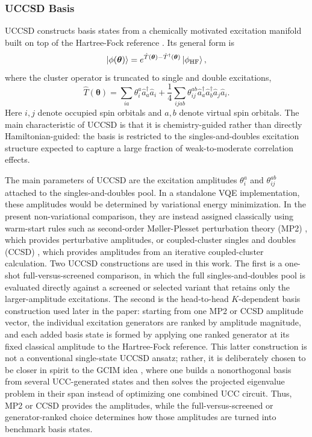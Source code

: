 \subsubsection{UCCSD Basis}

UCCSD constructs basis states from a chemically motivated excitation manifold built on top of the Hartree-Fock reference \cite{anand2022ucc}. Its general form is
\begin{equation}
\ket{\phi(\boldsymbol{\theta})}
= e^{\hat{T}(\boldsymbol{\theta})-\hat{T}^{\dagger}(\boldsymbol{\theta})}
\ket{\phi_{\mathrm{HF}}},
\end{equation}
where the cluster operator is truncated to single and double excitations,
\begin{equation}
\hat{T}(\boldsymbol{\theta})
= \sum_{ia} \theta_i^a \hat{a}_a^\dagger \hat{a}_i
+ \frac{1}{4}\sum_{ijab}\theta_{ij}^{ab}
\hat{a}_a^\dagger \hat{a}_b^\dagger \hat{a}_j \hat{a}_i .
\end{equation}
Here $i,j$ denote occupied spin orbitals and $a,b$ denote virtual spin orbitals. The main characteristic of UCCSD is that it is chemistry-guided rather than directly Hamiltonian-guided: the basis is restricted to the singles-and-doubles excitation structure expected to capture a large fraction of weak-to-moderate correlation effects.

The main parameters of UCCSD are the excitation amplitudes $\theta_i^a$ and $\theta_{ij}^{ab}$ attached to the singles-and-doubles pool. In a standalone VQE implementation, these amplitudes would be determined by variational energy minimization. In the present non-variational comparison, they are instead assigned classically using warm-start rules such as second-order M{\o}ller-Plesset perturbation theory (MP2) \cite{moller1934mp2}, which provides perturbative amplitudes, or coupled-cluster singles and doubles (CCSD) \cite{purvis1982ccsd}, which provides amplitudes from an iterative coupled-cluster calculation. Two UCCSD constructions are used in this work. The first is a one-shot full-versus-screened comparison, in which the full singles-and-doubles pool is evaluated directly against a screened or selected variant that retains only the larger-amplitude excitations. The second is the head-to-head $K$-dependent basis construction used later in the paper: starting from one MP2 or CCSD amplitude vector, the individual excitation generators are ranked by amplitude magnitude, and each added basis state is formed by applying one ranked generator at its fixed classical amplitude to the Hartree-Fock reference. This latter construction is not a conventional single-state UCCSD ansatz; rather, it is deliberately chosen to be closer in spirit to the GCIM idea \cite{zheng2024gcim}, where one builds a nonorthogonal basis from several UCC-generated states and then solves the projected eigenvalue problem in their span instead of optimizing one combined UCC circuit. Thus, MP2 or CCSD provides the amplitudes, while the full-versus-screened or generator-ranked choice determines how those amplitudes are turned into benchmark basis states.

